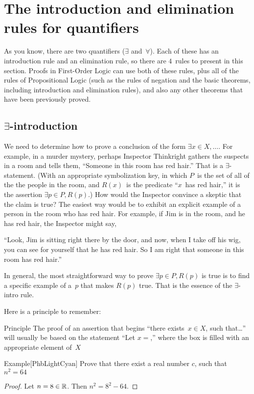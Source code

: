 \documentclass[../MATH-2000-Notes.tex]{subfiles}
\begin{document}
\section{The introduction and elimination rules for quantifiers}
As you know, there are two quantifiers ($\exists$ and~$\forall$). Each of these has an introduction rule and an elimination rule, so there are $4$~rules to present in this section. 
Proofs in First-Order Logic can use both of these rules, plus all of the rules of Propositional Logic (such as the rules of negation and the basic theorems, including introduction and elimination rules), and also any other theorems that have been previously proved.
\subsection{\texorpdfstring{$\exists$}{}-introduction}
We need to determine how to prove a conclusion of the form 
$\exists x \in X, \dots$. 
For example, in a murder mystery, perhaps Inspector Thinkright gathers the suspects in a room and tells them, ``Someone in this room has red hair\rlap.'' That is a $\exists$-statement. (With an appropriate symbolization key, in which $P$~is the set of all of the the people in the room, and $R(x)$~is the predicate ``$x$~has red hair\rlap,'' it is the assertion $\exists p \in P, R(p)$.) How would the Inspector convince a skeptic that the claim is true? The easiest way would be to exhibit an explicit example of a person in the room who has red hair. For example, if Jim is in the room, and he has red hair, the Inspector might say,
\begin{quotebox}
``Look, Jim is sitting right there by the door, and now, when I take off his wig, you can see for yourself that he has red hair. So I am right that someone in this room has red hair\rlap.'' 
\end{quotebox}
In general, the most straightforward way to prove $\exists p \in P, R(p)$ is true is to find a specific example of a~$p$ that makes $R(p)$ true. That is the essence of the $\exists$-intro rule. 

Here is a principle to remember:
\begin{paperbox}{Principle}
    The proof of an assertion that begins ``there exists~$x \in X$, such that\dots'' will usually be based on the statement ``Let $x =\boxed{}$\rlap,'' where the box is filled with an appropriate element of~$X$
\end{paperbox}
\begin{commentbox}{Example}[{PhbLightCyan}]
    Prove that there exist a real number \(c\), such that \(n^2 = 64\)
\end{commentbox}
\begin{proof}
    Let \(n = 8 \in \mathbb{R}\). Then \(n^2 = 8^2 - 64\).
\end{proof}
\end{document}
